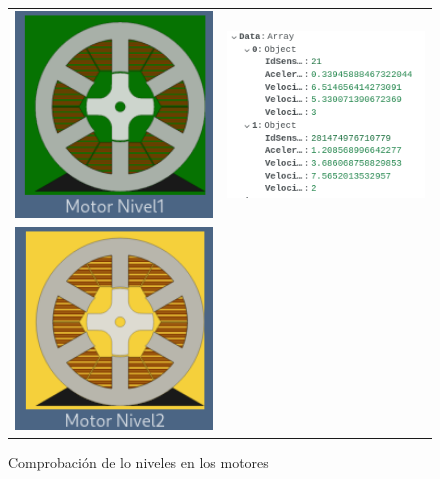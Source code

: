 \documentclass[12pt]{article}
\begin{document}
\begin{refsegment}
    
    
    
    
    
    \begin{figure}[H]
        \centering
        \caption{Comprobación de lo niveles en los motores}
        \begin{tabular}{m{6cm}m{6cm}}
            \includegraphics[width=6cm]{comprobacion_resultados/finales/n1.png}&
            \includegraphics[width=6cm]{comprobacion_resultados/finales/n1mongo.png}\\
            \includegraphics[width=6cm]{comprobacion_resultados/finales/n2.png}&

\end{tabular}
\end{figure}
\end{refsegment}
\end{document}
